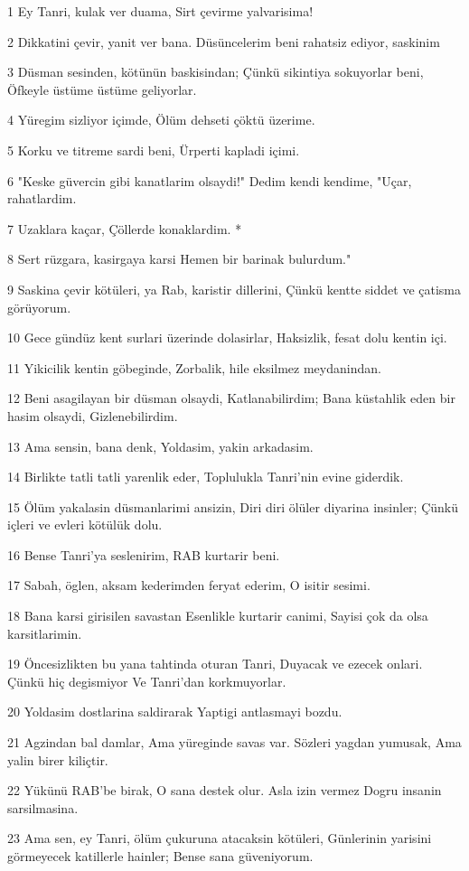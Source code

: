 \par 1 Ey Tanri, kulak ver duama, Sirt çevirme yalvarisima!
\par 2 Dikkatini çevir, yanit ver bana. Düsüncelerim beni rahatsiz ediyor, saskinim
\par 3 Düsman sesinden, kötünün baskisindan; Çünkü sikintiya sokuyorlar beni, Öfkeyle üstüme üstüme geliyorlar.
\par 4 Yüregim sizliyor içimde, Ölüm dehseti çöktü üzerime.
\par 5 Korku ve titreme sardi beni, Ürperti kapladi içimi.
\par 6 "Keske güvercin gibi kanatlarim olsaydi!" Dedim kendi kendime, "Uçar, rahatlardim.
\par 7 Uzaklara kaçar, Çöllerde konaklardim. *
\par 8 Sert rüzgara, kasirgaya karsi Hemen bir barinak bulurdum."
\par 9 Saskina çevir kötüleri, ya Rab, karistir dillerini, Çünkü kentte siddet ve çatisma görüyorum.
\par 10 Gece gündüz kent surlari üzerinde dolasirlar, Haksizlik, fesat dolu kentin içi.
\par 11 Yikicilik kentin göbeginde, Zorbalik, hile eksilmez meydanindan.
\par 12 Beni asagilayan bir düsman olsaydi, Katlanabilirdim; Bana küstahlik eden bir hasim olsaydi, Gizlenebilirdim.
\par 13 Ama sensin, bana denk, Yoldasim, yakin arkadasim.
\par 14 Birlikte tatli tatli yarenlik eder, Toplulukla Tanri'nin evine giderdik.
\par 15 Ölüm yakalasin düsmanlarimi ansizin, Diri diri ölüler diyarina insinler; Çünkü içleri ve evleri kötülük dolu.
\par 16 Bense Tanri'ya seslenirim, RAB kurtarir beni.
\par 17 Sabah, öglen, aksam kederimden feryat ederim, O isitir sesimi.
\par 18 Bana karsi girisilen savastan Esenlikle kurtarir canimi, Sayisi çok da olsa karsitlarimin.
\par 19 Öncesizlikten bu yana tahtinda oturan Tanri, Duyacak ve ezecek onlari. Çünkü hiç degismiyor Ve Tanri'dan korkmuyorlar.
\par 20 Yoldasim dostlarina saldirarak Yaptigi antlasmayi bozdu.
\par 21 Agzindan bal damlar, Ama yüreginde savas var. Sözleri yagdan yumusak, Ama yalin birer kiliçtir.
\par 22 Yükünü RAB'be birak, O sana destek olur. Asla izin vermez Dogru insanin sarsilmasina.
\par 23 Ama sen, ey Tanri, ölüm çukuruna atacaksin kötüleri, Günlerinin yarisini görmeyecek katillerle hainler; Bense sana güveniyorum.


